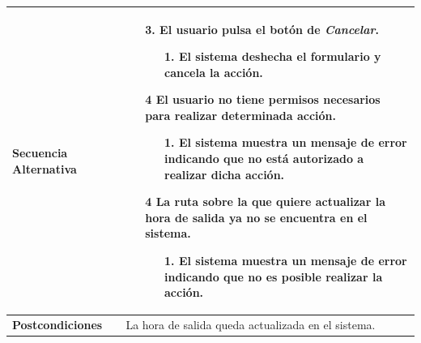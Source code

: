 \begin{longtable}{| p{4cm} | p{10cm} |}
\\
\hline
\textbf{Secuencia Alternativa} &\mbox{}\par\vspace{-\baselineskip}
\begin{enumerate}[leftmargin=0.9cm, topsep=0.1cm]
\item[3.] El usuario pulsa el botón de \textit{Cancelar}.
	\begin{itemize}
	\item[1.] El sistema deshecha el formulario y cancela la acción.
	\end{itemize}
\item[4] El usuario no tiene permisos necesarios para realizar determinada acción.
	\begin{itemize}
	\item[1.] El sistema muestra un mensaje de error indicando que no está autorizado a realizar dicha acción.
	\end{itemize}
\item[4] La ruta sobre la que quiere actualizar la hora de salida ya no se encuentra en el sistema.
	\begin{itemize}
	\item[1.] El sistema muestra un mensaje de error indicando que no es posible realizar la acción.
	\end{itemize}
\end{enumerate}
\\

\hline
\textbf{Postcondiciones} & 
La hora de salida queda actualizada en el sistema.\\
\hline
\end{longtable}



\newpage
